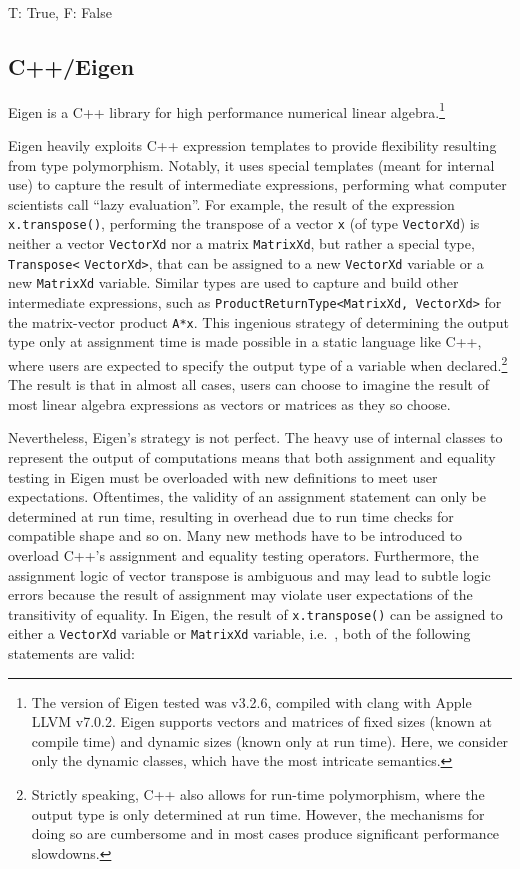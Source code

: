 T: True, F: False



\subsection{C++/Eigen}

Eigen is a C++ library for high performance numerical linear
algebra.\cite{eigenweb}\footnote{The version of Eigen tested was v3.2.6,
compiled with clang with Apple LLVM v7.0.2. Eigen supports vectors and
matrices of fixed sizes (known at compile time) and dynamic sizes (known only
at run time). Here, we consider only the dynamic classes, which have
the most intricate semantics.
}

Eigen heavily exploits C++ expression templates to provide flexibility
resulting from type polymorphism. Notably, it uses special templates (meant for
internal use) to capture the result of intermediate expressions, performing
what computer scientists call ``lazy evaluation''. For example, the result of
the expression \verb|x.transpose()|, performing the transpose of a vector
\verb|x| (of type \verb|VectorXd|) is neither a vector \verb|VectorXd| nor a
matrix \verb|MatrixXd|, but rather a special type, \verb|Transpose<|
\verb|VectorXd>|, that can be assigned to a new \verb|VectorXd| variable or a
new \verb|MatrixXd| variable. Similar types are used to capture and build other
intermediate expressions, such as \verb|ProductReturnType<MatrixXd, VectorXd>|
for the matrix-vector product \verb|A*x|.  This ingenious strategy of
determining the output type only at assignment time is made possible in a
static language like C++, where users are expected to specify the output type
of a variable when declared.\footnote{Strictly speaking, C++ also allows for
run-time polymorphism, where the output type is only determined at run time.
However, the mechanisms for doing so are cumbersome and in most cases produce
significant performance slowdowns.} The result is that in almost all cases,
users can choose to imagine the result of most linear algebra expressions as
vectors or matrices as they so choose.

Nevertheless, Eigen's strategy is not perfect. The heavy use of internal
classes to represent the output of computations means that both assignment and
equality testing in Eigen must be overloaded with new definitions to meet user
expectations. Oftentimes, the validity of an assignment statement can only be
determined at run time, resulting in overhead due to run time checks for
compatible shape and so on. Many new methods have to be introduced to overload
C++'s assignment and equality testing operators. Furthermore, the assignment
logic of vector transpose is ambiguous and may lead to subtle logic errors
because the result of assignment may violate user expectations of the
transitivity of equality. In Eigen, the result of \verb|x.transpose()| can be
assigned to either a \verb|VectorXd| variable or \verb|MatrixXd| variable,
i.e.\ , both of the following statements are valid:

